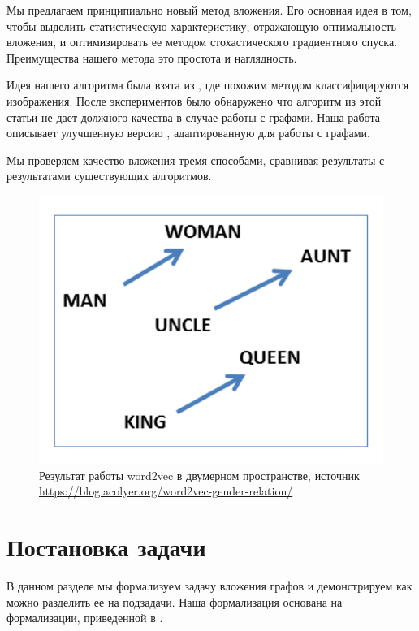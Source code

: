 \documentclass[12pt,a4paper]{extarticle}
\begin{document}
    
    Мы предлагаем принципиально новый метод вложения.
    Его основная идея в том, чтобы выделить статистическую характеристику, отражающую оптимальность вложения, и оптимизировать ее методом стохастического градиентного спуска.
    Преимущества нашего метода это простота и наглядность.
    
    Идея нашего алгоритма была взята из \cite{hist_loss}, где похожим методом классифицируются изображения.
    После экспериментов было обнаружено что алгоритм из этой статьи не дает должного качества в случае работы с графами. Наша работа описывает улучшенную версию \cite{hist_loss}, адаптированную для работы с графами.
    
    Мы проверяем качество вложения тремя способами, сравнивая результаты с результатами существующих алгоритмов.

    \begin{figure}
    \centering
    \includegraphics[width=.6\linewidth]{src/images/word2vec.png}
    \caption{Результат работы word2vec в двумерном пространстве, источник \url{https://blog.acolyer.org/word2vec-gender-relation/}}
    \label{fig:word2vec}
    \end{figure}

    \section{Постановка задачи}
    В данном разделе мы формализуем задачу вложения графов и демонстрируем как можно разделить ее на подзадачи. Наша формализация основана на формализации, приведенной в \cite{survey2}.
\end{document}
